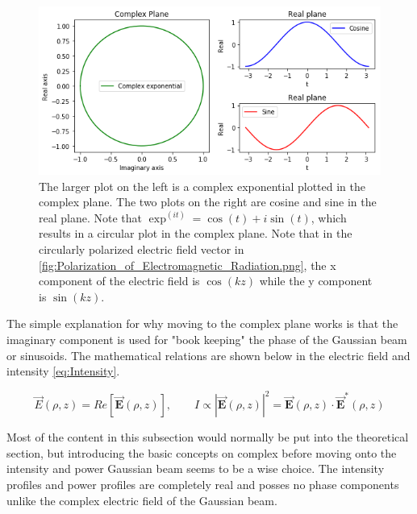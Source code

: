 \documentclass[11pt,a4paper]{book}
\begin{document}
		\begin{figure} 
		\centering
		\includegraphics[scale=0.8]{images/chapter-3/Complex_exponential_sine_cosine.png}
		\caption{The larger plot on the left is a complex exponential plotted in the complex plane. The two plots on the right are cosine and sine in the real plane. Note that $\exp^{(it)}=\cos(t)+i \sin(t)$, which results in a circular plot in the complex plane. Note that in the circularly polarized electric field vector in \autoref{fig:Polarization_of_Electromagnetic_Radiation.png}, the x component of the electric field is $\cos(kz)$ while the y component is $\sin(kz)$.}
		\label{fig:Complex_exponential_sine_cosine.png}	
		\end{figure}
		
		The simple explanation for why moving to the complex plane works is that the imaginary component is used for "book keeping" the phase of the Gaussian beam or sinusoids. The mathematical relations are shown below in the electric field and intensity \autoref{eq:Intensity}.
		
		\begin{equation} 
			\vec{E}(\rho,z)=Re[\vec{\textbf{E}}(\rho,z)], \qquad
			\textit{I} \propto |\vec{\textbf{E}}(\rho,z)|^2=\vec{\textbf{E}}(\rho,z)\cdot \vec{\textbf{E}}^*(\rho,z)
			\label{eq:Intensity}
		\end{equation}
		
		Most of the content in this subsection would normally be put into the theoretical section, but introducing the basic concepts on complex before moving onto the intensity and power Gaussian beam seems to be a wise choice. The intensity profiles and power profiles are completely real and posses no phase components unlike the complex electric field of the Gaussian beam.
\end{document}
